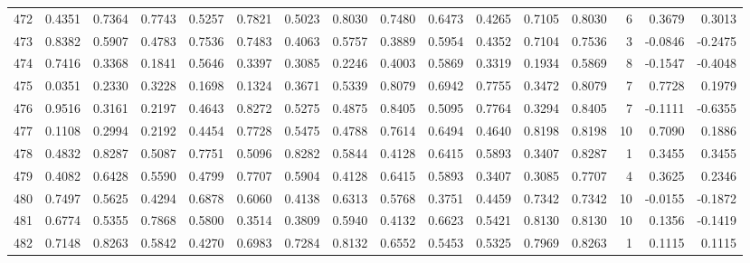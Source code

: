 \begin{tabular}{lrrrrrrrrrrrrrrr}
472 &      0.4351 &  0.7364 &  0.7743 &  0.5257 &  0.7821 &  0.5023 &  0.8030 &  0.7480 &  0.6473 &  0.4265 &   0.7105 &     0.8030 &      6 &                    0.3679 &                     0.3013 \\
473 &      0.8382 &  0.5907 &  0.4783 &  0.7536 &  0.7483 &  0.4063 &  0.5757 &  0.3889 &  0.5954 &  0.4352 &   0.7104 &     0.7536 &      3 &                   -0.0846 &                    -0.2475 \\
474 &      0.7416 &  0.3368 &  0.1841 &  0.5646 &  0.3397 &  0.3085 &  0.2246 &  0.4003 &  0.5869 &  0.3319 &   0.1934 &     0.5869 &      8 &                   -0.1547 &                    -0.4048 \\
475 &      0.0351 &  0.2330 &  0.3228 &  0.1698 &  0.1324 &  0.3671 &  0.5339 &  0.8079 &  0.6942 &  0.7755 &   0.3472 &     0.8079 &      7 &                    0.7728 &                     0.1979 \\
476 &      0.9516 &  0.3161 &  0.2197 &  0.4643 &  0.8272 &  0.5275 &  0.4875 &  0.8405 &  0.5095 &  0.7764 &   0.3294 &     0.8405 &      7 &                   -0.1111 &                    -0.6355 \\
477 &      0.1108 &  0.2994 &  0.2192 &  0.4454 &  0.7728 &  0.5475 &  0.4788 &  0.7614 &  0.6494 &  0.4640 &   0.8198 &     0.8198 &     10 &                    0.7090 &                     0.1886 \\
478 &      0.4832 &  0.8287 &  0.5087 &  0.7751 &  0.5096 &  0.8282 &  0.5844 &  0.4128 &  0.6415 &  0.5893 &   0.3407 &     0.8287 &      1 &                    0.3455 &                     0.3455 \\
479 &      0.4082 &  0.6428 &  0.5590 &  0.4799 &  0.7707 &  0.5904 &  0.4128 &  0.6415 &  0.5893 &  0.3407 &   0.3085 &     0.7707 &      4 &                    0.3625 &                     0.2346 \\
480 &      0.7497 &  0.5625 &  0.4294 &  0.6878 &  0.6060 &  0.4138 &  0.6313 &  0.5768 &  0.3751 &  0.4459 &   0.7342 &     0.7342 &     10 &                   -0.0155 &                    -0.1872 \\
481 &      0.6774 &  0.5355 &  0.7868 &  0.5800 &  0.3514 &  0.3809 &  0.5940 &  0.4132 &  0.6623 &  0.5421 &   0.8130 &     0.8130 &     10 &                    0.1356 &                    -0.1419 \\
482 &      0.7148 &  0.8263 &  0.5842 &  0.4270 &  0.6983 &  0.7284 &  0.8132 &  0.6552 &  0.5453 &  0.5325 &   0.7969 &     0.8263 &      1 &                    0.1115 &                     0.1115 \\

\end{tabular}
